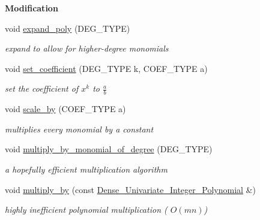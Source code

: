 \begin{Indent}\textbf{ Modification}\par
\begin{DoxyCompactItemize}
\item 
void \hyperlink{group__polygroup_a58fc0f5eefa5d11cdd17d3453eb9ac0d}{expand\+\_\+poly} (D\+E\+G\+\_\+\+T\+Y\+PE)
\begin{DoxyCompactList}\small\item\em expand to allow for higher-\/degree monomials \end{DoxyCompactList}\item 
\mbox{\label{group__polygroup_a132de1284f006ae6e943c50e8fdee973}} 
void \hyperlink{group__polygroup_a132de1284f006ae6e943c50e8fdee973}{set\+\_\+coefficient} (D\+E\+G\+\_\+\+T\+Y\+PE k, C\+O\+E\+F\+\_\+\+T\+Y\+PE a)
\begin{DoxyCompactList}\small\item\em set the coefficient of $x^k$ to $\frac{a}{b}$ \end{DoxyCompactList}\item 
\mbox{\label{group__polygroup_a0e56525a2b24c37a6a43c2175b9b6178}} 
void \hyperlink{group__polygroup_a0e56525a2b24c37a6a43c2175b9b6178}{scale\+\_\+by} (C\+O\+E\+F\+\_\+\+T\+Y\+PE a)
\begin{DoxyCompactList}\small\item\em multiplies every monomial by a constant \end{DoxyCompactList}\item 
void \hyperlink{group__polygroup_a984a6d80cc0182348e20c60f20e4e180}{multiply\+\_\+by\+\_\+monomial\+\_\+of\+\_\+degree} (D\+E\+G\+\_\+\+T\+Y\+PE)
\begin{DoxyCompactList}\small\item\em a hopefully efficient multiplication algorithm \end{DoxyCompactList}\item 
\mbox{\label{group__polygroup_a8c06ba1749b4197a9e1676cfeb87134e}} 
void \hyperlink{group__polygroup_a8c06ba1749b4197a9e1676cfeb87134e}{multiply\+\_\+by} (const \hyperlink{group__polygroup_class_dense___univariate___integer___polynomial}{Dense\+\_\+\+Univariate\+\_\+\+Integer\+\_\+\+Polynomial} \&)
\begin{DoxyCompactList}\small\item\em highly inefficient polynomial multiplication ( $O(mn)$) \end{DoxyCompactList}\item 

\end{DoxyCompactItemize}
\end{Indent}
